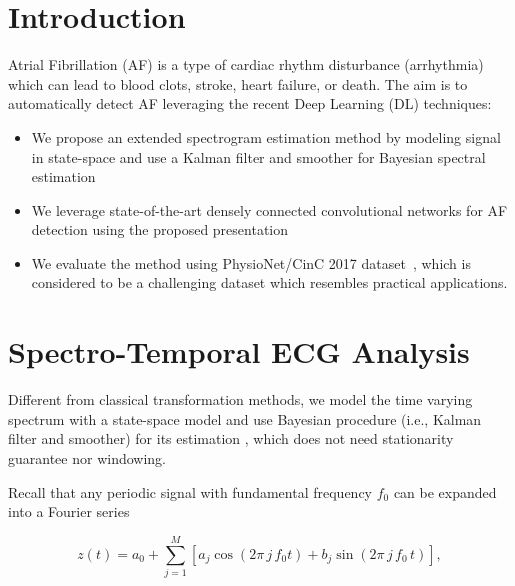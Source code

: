 \documentclass[portrait,a0,final]{a0poster} %
\newcommand{\sectionspace}{10mm} %
\begin{document}
\begin{minipage}{0.98\linewidth}




\begin{minipage}[t]{0.47\linewidth}
\setlength{\parindent}{10mm} %


\section{Introduction}
\Large
Atrial Fibrillation (AF) is a type of cardiac rhythm disturbance (arrhythmia) which can lead to blood clots, stroke, heart failure, or death. The aim is to automatically detect AF leveraging the recent Deep Learning (DL) techniques:
\vspace{10mm}
\begin{itemize}
	\item We propose an extended spectrogram estimation method by modeling signal in state-space and use a Kalman filter and smoother for Bayesian spectral estimation
	\item We leverage state-of-the-art densely connected convolutional networks \cite{huang2017densely} for AF detection using the proposed presentation
	\item We evaluate the method using PhysioNet/CinC 2017 dataset~\cite{clifford2017af}, which is considered to be a challenging dataset which resembles practical applications.
\end{itemize}

\vspace{\sectionspace}
\section{Spectro-Temporal ECG Analysis}

Different from classical transformation methods, we model the time varying spectrum with a state-space model and use Bayesian procedure (i.e., Kalman filter and smoother) for its estimation \cite{qi2002bayesian}, which does not need stationarity guarantee nor windowing. 

Recall that any periodic signal with fundamental frequency $f_0$ can be expanded into a Fourier series

\begin{equation}
z(t) = a_0 + \sum_{j=1}^{M} \left[ a_{j} \cos(2\pi \, j \, f_0 t) + b_{j} \sin(2\pi  \, j \, f_0 \, t) \right],
\label{equ:fourier_series}
\end{equation}


\end{minipage}
\end{minipage}
\end{document}
